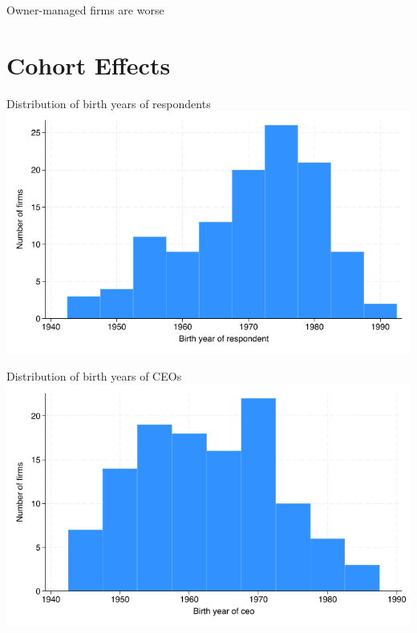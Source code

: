 \documentclass[
  ignorenonframetext,
  aspectratio=1610,
]{beamer}
\begin{document}
\begin{frame}{Owner-managed firms are worse}
\protect\hypertarget{owner-managed-firms-are-worse}{}
\end{frame}

\section{Cohort Effects}\label{cohort-effects}

\begin{frame}{Distribution of birth years of respondents}
\protect\hypertarget{distribution-of-birth-years-of-respondents}{}
\includegraphics{fig/cohort-respondent-histogram.png}
\end{frame}

\begin{frame}{Distribution of birth years of CEOs}
\protect\hypertarget{distribution-of-birth-years-of-ceos}{}
\includegraphics{fig/cohort-ceo-histogram.png}
\end{frame}
\end{document}
